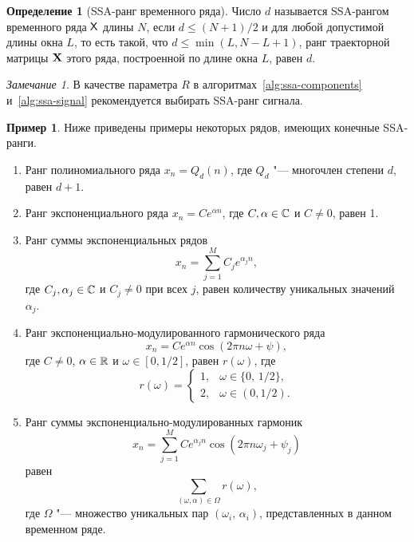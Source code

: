 \documentclass[specialist,
  substylefile=spbu_report.rtx,
subf,href,colorlinks=true, 12pt]{disser}
\theoremstyle{plain}
\theoremstyle{definition}
\newtheorem{definition}{Определение}[section]
\newtheorem{example}{Пример}[section]
\theoremstyle{remark}
\newtheorem{remark}{Замечание}[section]
\begin{document}
\begin{definition}[SSA-ранг временного ряда]
  \label{def:ssa-rank}
  Число $d$ называется SSA-рангом временного ряда $\mathsf{X}$ длины $N$,
  если $d \leqslant (N+1) / 2$ и для любой допустимой
  длины окна $L$,
  то есть такой, что $d \leqslant \min(L, N- L + 1)$, ранг
  траекторной матрицы $\mathbf{X}$ этого ряда, построенной по
  длине окна $L$, равен $d$.
\end{definition}
\begin{remark}
  В качестве параметра $R$ в алгоритмах~\ref{alg:ssa-components}
  и~\ref{alg:ssa-signal} рекомендуется выбирать
  SSA-ранг сигнала.
\end{remark}

\begin{example}
  \label{ex:ssa-ranks}
  Ниже приведены примеры некоторых рядов, имеющих конечные SSA-ранги.
  \begin{enumerate}
    \item Ранг полиномиального ряда $x_n = Q_d(n)$, где $Q_d$ "---
      многочлен степени $d$, равен $d + 1$.
    \item\label{enum:exp-rank} Ранг экспоненциального ряда $x_n = C
      e^{\alpha n}$, где
      $C, \alpha \in \mathbb{C}$ и $C \ne 0$, равен 1.
    \item\label{enum:exp-sum-rank} Ранг суммы экспоненциальных рядов
      \[
        x_n = \sum_{j=1}^{M} C_j e^{\alpha_j n},
      \]
      где $C_j, \alpha_j \in \mathbb{C}$ и $C_j \ne 0$ при всех $j$, равен
      количеству уникальных
      значений $\alpha_j$.
    \item\label{enum:cos-rank} Ранг экспоненциально-модулированного
      гармонического ряда
      \[
        x_n = C e^{\alpha n}\cos(2 \pi n \omega + \psi),
      \]
      где $C \ne 0$, $\alpha \in \mathbb{R}$ и $\omega \in [0,1/2]$,
      равен $r(\omega)$, где
      \begin{equation}
        \label{eq:cos-rank}
        r(\omega) =
        \begin{cases}
          1, & \omega \in \{0,\, 1/2\},\\
          2, & \omega \in (0, 1/2).
        \end{cases}
      \end{equation}
    \item\label{enum:cos-sum-rank} Ранг суммы
      экспоненциально-модулированных гармоник
      \[
        x_n = \sum_{j=1}^{M} C e^{\alpha_j n}\cos(2 \pi n \omega_j + \psi_j)
      \]
      равен
      \begin{equation*}
        \label{eq:cos-sum-rank}
        \sum_{(\omega, \alpha)\in \Omega} r(\omega),
      \end{equation*}
      где $\Omega$ "--- множество уникальных пар $(\omega_i,\,
      \alpha_i)$, представленных в данном временном ряде.
  \end{enumerate}
\end{example}
\end{document}
